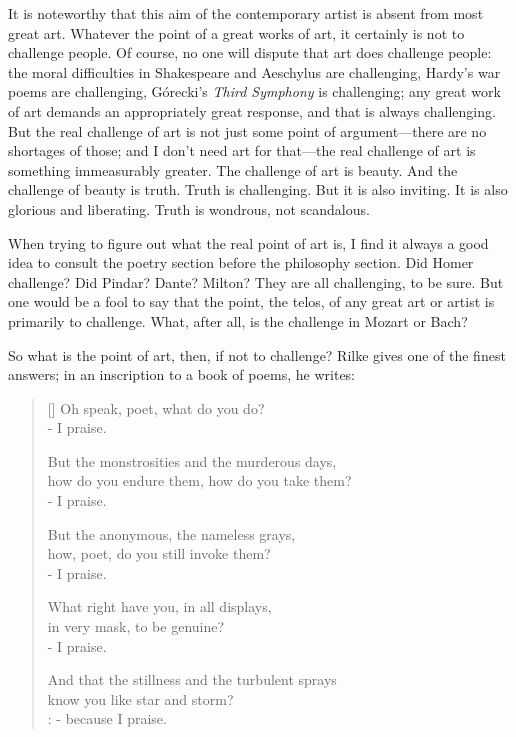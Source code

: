 \documentclass[letterpaper]{article}
\begin{document}
It is noteworthy that this aim of the contemporary artist is absent
from most great art. Whatever the point of a great works of art, it
certainly is not to challenge people. Of course, no one will dispute
that art does challenge people: the moral difficulties in Shakespeare
and Aeschylus are challenging, Hardy's war poems are challenging,
Górecki's \emph{Third Symphony} is challenging; any great work of art
demands an appropriately great response, and that is always
challenging. But the real challenge of art is not just some point of
argument---there are no shortages of those; and I don't need art for
that---the real challenge of art is something immeasurably
greater. The challenge of art is beauty. And the challenge of beauty
is truth. Truth is challenging. But it is also inviting. It is also
glorious and liberating. Truth is wondrous, not scandalous.

When trying to figure out what the real point of art is, I find it
always a good idea to consult the poetry section before the philosophy
section. Did Homer challenge? Did Pindar? Dante? Milton? They are all
challenging, to be sure. But one would be a fool to say that the
point, the telos, of any great art or artist is primarily to
challenge. What, after all, is the challenge in Mozart or Bach?

So what is the point of art, then, if not to challenge? Rilke gives
one of the finest answers; in an inscription to a book of poems, he
writes:

\begin{minipage}{\linewidth}
\settowidth{\versewidth}{Oh speak, poet, what do you do?}
\setlength{\vgap}{11em}
\begin{verse}[\versewidth]
Oh speak, poet, what do you do? \\
\vin                    - I praise.

But the monstrosities and the murderous days, \\
how do you endure them, how do you take them? \\
\vin                    - I praise.

But the anonymous, the nameless grays, \\
how, poet, do you still invoke them? \\
\vin                    - I praise.

What right have you, in all displays, \\
in very mask, to be genuine? \\
\vin                    - I praise.

And that the stillness and the turbulent sprays \\
know you like star and storm? \\
\vin                     : - because I praise.
\end{verse}
\end{minipage}
\end{document}
